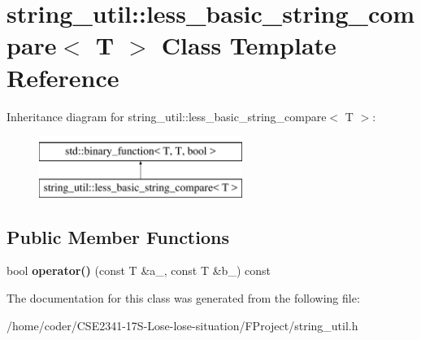 \section{string\+\_\+util\+:\+:less\+\_\+basic\+\_\+string\+\_\+compare$<$ T $>$ Class Template Reference}
\label{classstring__util_1_1less__basic__string__compare}
Inheritance diagram for string\+\_\+util\+:\+:less\+\_\+basic\+\_\+string\+\_\+compare$<$ T $>$\+:\begin{figure}[H]
\begin{center}
\leavevmode
\includegraphics[height=2.000000cm]{classstring__util_1_1less__basic__string__compare}
\end{center}
\end{figure}
\subsection*{Public Member Functions}
\begin{DoxyCompactItemize}
\item 
bool {\bfseries operator()} (const T \&a\+\_\+, const T \&b\+\_\+) const \label{classstring__util_1_1less__basic__string__compare_a259341e58f36d8aaf75f2415de0df4d8}

\end{DoxyCompactItemize}


The documentation for this class was generated from the following file\+:\begin{DoxyCompactItemize}
\item 
/home/coder/\+C\+S\+E2341-\/17\+S-\/\+Lose-\/lose-\/situation/\+F\+Project/string\+\_\+util.\+h\end{DoxyCompactItemize}
